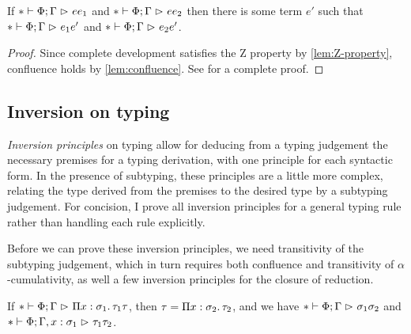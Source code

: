 \begin{theorem}[Confluence] \label{thm:confluence}
If $* \mathrel{\vdash} \Phi; \Gamma \mathrel{\rhd}_{} e{e_1}$ and $* \mathrel{\vdash} \Phi; \Gamma \mathrel{\rhd}_{} e{e_2}$
then there is some term $e'$ such that
$* \mathrel{\vdash} \Phi; \Gamma \mathrel{\rhd}_{} e_1{e'}$ and $* \mathrel{\vdash} \Phi; \Gamma \mathrel{\rhd}_{} e_2{e'}$.
\end{theorem}

\begin{proof}
Since complete development satisfies the Z property by \cref{lem:Z-property},
confluence holds by \cref{lem:confluence}.
See \citet[Theorem 3.10]{confluence} for a complete proof.
\end{proof}

\subsection{Inversion on typing}

\emph{Inversion principles} on typing
allow for deducing from a typing judgement the necessary premises for a typing derivation,
with one principle for each syntactic form.
In the presence of subtyping, these principles are a little more complex,
relating the type derived from the premises to the desired type by a subtyping judgement.
For concision, I prove all inversion principles for a general typing rule
rather than handling each rule explicitly.

Before we can prove these inversion principles,
we need transitivity of the subtyping judgement,
which in turn requires both confluence and transitivity of $\alpha$-cumulativity,
as well a few inversion principles for the closure of reduction.

\begin{lemma} \label{lem:inversion-red}
If $* \mathrel{\vdash} \Phi; \Gamma \mathrel{\rhd}_{} \Pi x \mathrel{:} \sigma_1 \mathpunct{.} \tau_1{\tau}$,
then $\tau = \Pi x \mathrel{:} \sigma_2 \mathpunct{.} \tau_2$,
and we have $* \mathrel{\vdash} \Phi; \Gamma \mathrel{\rhd}_{} \sigma_1{\sigma_2}$
and $* \mathrel{\vdash} \Phi; \Gamma, x \mathrel{:} \sigma_1 \mathrel{\rhd}_{} \tau_1{\tau_2}$.
\end{lemma}

